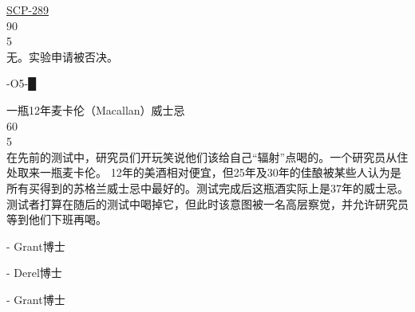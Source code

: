 \begin{scpbox}
\hyperref[chap:SCP-289]{SCP-289}\\
90\\
5\\
无。实验申请被否决。

-O5-█

一瓶12年麦卡伦（Macallan）威士忌\\
60\\
5\\
在先前的测试中，研究员们开玩笑说他们该给自己“辐射”点喝的。一个研究员从住处取来一瓶麦卡伦。 12年的美酒相对便宜，但25年及30年的佳酿被某些人认为是所有买得到的苏格兰威士忌中最好的。测试完成后这瓶酒实际上是37年的威士忌。测试者打算在随后的测试中喝掉它，但此时该意图被一名高层察觉，并允许研究员等到他们下班再喝。

- Grant博士

- Derel博士

- Grant博士

\end{scpbox}
